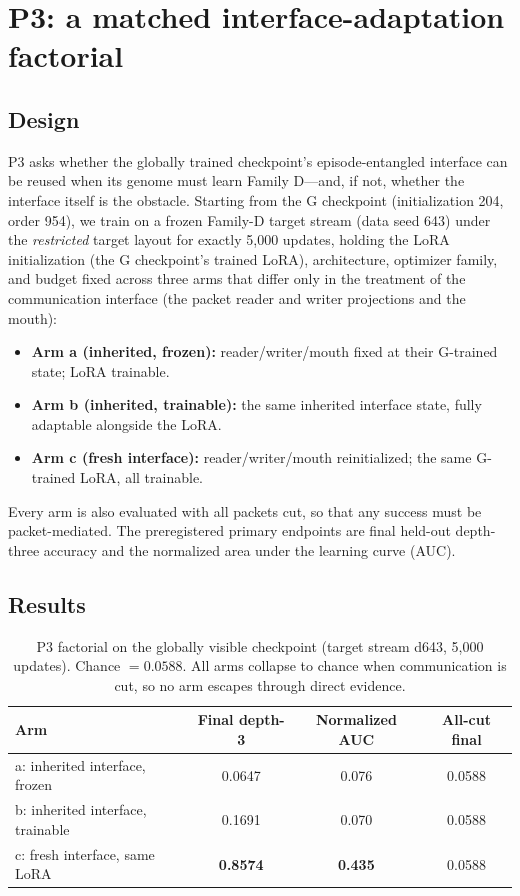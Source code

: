 \documentclass[11pt]{article}
\begin{document}
\section{P3: a matched interface-adaptation factorial}\label{sec:p3}

\subsection{Design}

P3 asks whether the globally trained checkpoint's episode-entangled interface can be reused when its genome must learn Family D---and, if not, whether the interface itself is the obstacle. Starting from the G checkpoint (initialization 204, order 954), we train on a frozen Family-D target stream (data seed 643) under the \emph{restricted} target layout for exactly 5{,}000 updates, holding the LoRA initialization (the G checkpoint's trained LoRA), architecture, optimizer family, and budget fixed across three arms that differ only in the treatment of the communication interface (the packet reader and writer projections and the mouth):

\begin{itemize}
\item \textbf{Arm a (inherited, frozen):} reader/writer/mouth fixed at their G-trained state; LoRA trainable.
\item \textbf{Arm b (inherited, trainable):} the same inherited interface state, fully adaptable alongside the LoRA.
\item \textbf{Arm c (fresh interface):} reader/writer/mouth reinitialized; the same G-trained LoRA, all trainable.
\end{itemize}

Every arm is also evaluated with all packets cut, so that any success must be packet-mediated. The preregistered primary endpoints are final held-out depth-three accuracy and the normalized area under the learning curve (AUC).

\subsection{Results}

\begin{table}[t]
\centering
\caption{P3 factorial on the globally visible checkpoint (target stream d643, 5{,}000 updates). Chance $=0.0588$. All arms collapse to chance when communication is cut, so no arm escapes through direct evidence.}
\label{tab:p3}
\begin{tabular}{lccc}
\toprule
Arm & Final depth-3 & Normalized AUC & All-cut final \\
\midrule
a: inherited interface, frozen    & 0.0647 & 0.076 & 0.0588 \\
b: inherited interface, trainable & 0.1691 & 0.070 & 0.0588 \\
c: fresh interface, same LoRA     & \textbf{0.8574} & \textbf{0.435} & 0.0588 \\
\bottomrule
\end{tabular}
\end{table}
\end{document}
